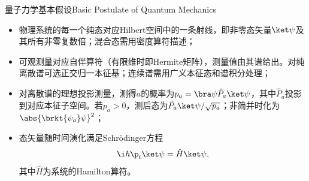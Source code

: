 \begin{postulate}
	{量子力学基本假设}{Basic Postulate of Quantum Mechanics}
	\begin{itemize}
		\item 物理系统的每一个纯态对应Hilbert空间中的一条射线，即非零态矢量$\ket\psi$及其所有非零复数倍；混合态需用密度算符描述；
		\item 可观测量对应自伴算符（有限维时即Hermite矩阵），测量值由其谱给出。对纯离散谱可选正交归一本征基；连续谱需用广义本征态和谱积分处理；
		\item 对离散谱的理想投影测量，测得$a$的概率为$p_a=\bra\psi\hat P_a\ket\psi$，其中$\hat P_a$投影到对应本征子空间。若$p_a>0$，测后态为$\hat P_a\ket\psi/\sqrt{p_a}$；非简并时化为$\abs{\brkt{\psi_a}\psi}^2$；
		\item 态矢量随时间演化满足Schrödinger方程
		\[
			\i\hbar\p_t\ket\psi=\hat H\ket\psi,
		\]
		其中$\hat H$为系统的Hamilton算符。
	\end{itemize}
\end{postulate}




